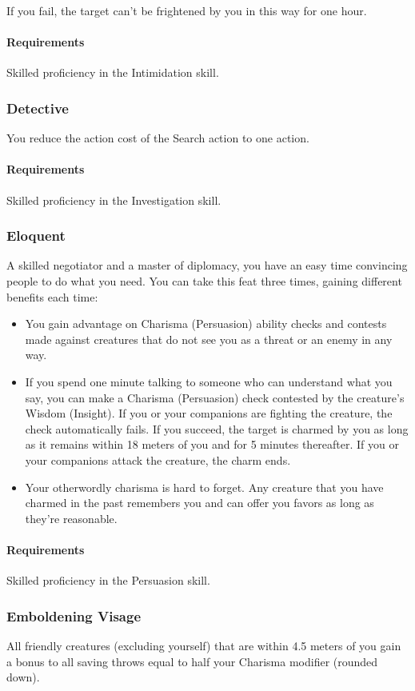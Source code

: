     If you fail, the target can't be frightened by you in this way for one hour.
    \paragraph{Requirements} Skilled proficiency in the Intimidation skill.
\subsubsection{Detective} \label{feat::detective}
    You reduce the action cost of the Search action to one action.
    \paragraph{Requirements} Skilled proficiency in the Investigation skill.
\subsubsection{Eloquent} \label{feat::eloquent}
    A skilled negotiator and a master of diplomacy, you have an easy time convincing people to do what you need.
    You can take this feat three times, gaining different benefits each time:
    \begin{itemize}
        \item You gain advantage on Charisma (Persuasion) ability checks and contests made against creatures that do not see you as a threat or an enemy in any way.
        \item If you spend one minute talking to someone who can understand what you say, you can make a Charisma (Persuasion) check contested by the creature's Wisdom (Insight).
        If you or your companions are fighting the creature, the check automatically fails.
        If you succeed, the target is charmed by you as long as it remains within 18 meters of you and for 5 minutes thereafter.
        If you or your companions attack the creature, the charm ends.
        \item Your otherwordly charisma is hard to forget.
        Any creature that you have charmed in the past remembers you and can offer you favors as long as they're reasonable.
    \end{itemize}
    \paragraph{Requirements} Skilled proficiency in the Persuasion skill.
\subsubsection{Emboldening Visage} \label{feat::emboldeningvisage}
    All friendly creatures (excluding yourself) that are within 4.5 meters of you gain a bonus to all saving throws equal to half your Charisma modifier (rounded down).

